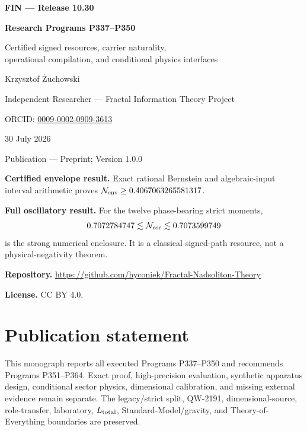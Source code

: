 \documentclass[11pt,a4paper,openany]{report}
\begin{document}
\hypersetup{pageanchor=false}
\begin{titlepage}
\centering
\vspace*{7mm}
{\Large\bfseries FIN --- Release 10.30\par}
\vspace{9mm}
{\Huge\bfseries Research Programs P337--P350\par}
\vspace{6mm}
{\Large Certified signed resources, carrier naturality,\\
operational compilation, and conditional physics interfaces\par}
\vspace{13mm}
{\Large Krzysztof \.Zuchowski\par}
\vspace{2mm}
{\normalsize Independent Researcher --- Fractal Information Theory Project\par}
\vspace{2mm}
{\normalsize ORCID:
\href{https://orcid.org/0009-0002-0909-3613}{0009-0002-0909-3613}\par}
\vspace{7mm}
{\large 30 July 2026\par}
{\normalsize Publication --- Preprint; Version 1.0.0\par}
\vfill
\begin{minipage}{0.92\textwidth}
\small
\textbf{Certified envelope result.}
Exact rational Bernstein and algebraic-input interval arithmetic proves
\(\mathcal N_{\rm env}\geq0.4067063265581317\).

\medskip
\textbf{Full oscillatory result.}
For the twelve phase-bearing strict moments,
\[
0.7072784747\lesssim\mathcal N_{\rm osc}
\lesssim0.7073599749
\]
is the strong numerical enclosure.  It is a classical signed-path resource,
not a physical-negativity theorem.

\medskip
\textbf{Repository.}
\url{https://github.com/hyconiek/Fractal-Nadsoliton-Theory}

\textbf{License.} CC BY 4.0.
\end{minipage}
\vfill
\end{titlepage}
\hypersetup{pageanchor=true}
\chapter*{Publication statement}
This monograph reports all executed Programs P337--P350 and recommends
Programs P351--P364.  Exact proof, high-precision evaluation, synthetic
apparatus design, conditional sector physics, dimensional calibration, and
missing external evidence remain separate.  The legacy/strict split,
QW-2191, dimensional-source, role-transfer, laboratory, \(L_{\rm total}\),
Standard-Model/gravity, and Theory-of-Everything boundaries are preserved.
\end{document}
